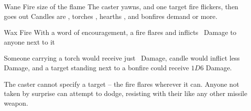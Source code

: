   {}%
  {Wane}%
  {Fire}%
  {size of the flame}%
  {The caster yawns, and one target fire flickers, then goes out}%
  {Candles are \tn[6], torches \tn[7], hearths \tn[8], and bonfires demand \tn[9] or more.}

  {}%
  {Wax}%
  {Fire}%
  {}%
  {With a word of encouragement, a fire flares and inflicts \showDam\ Damage to anyone next to it}%
  {

    Someone carrying a torch would receive just \showDam\ Damage, candle would inflict less Damage, and a target standing next to a bonfire could receive $1D6$ Damage.

    The caster cannot specify a target -- the fire flares wherever it can.
    Anyone not taken by surprise can attempt to dodge, resisting with their  like any other missile weapon.}

